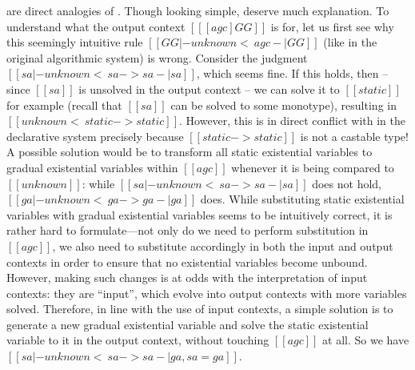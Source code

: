  are direct analogies of . Though
looking simple,  deserve much explanation. To
understand what the output context $[[ [agc]GG ]]$ is for, let us first see why
this seemingly intuitive rule $[[ GG |- unknown <~ agc -| GG ]]$ (like
 in the original algorithmic system) is wrong. Consider the
judgment $[[ sa |- unknown <~ sa -> sa -| sa ]]$, which seems fine. If this
holds, then -- since $[[sa]]$ is unsolved in the output context -- we can solve
it to $[[ static ]]$ for example (recall that $[[sa]]$ can be solved to some
monotype), resulting in $[[ unknown <~ static -> static ]]$. However, this is in
direct conflict with  in the declarative system precisely
because $[[ static -> static ]]$ is not a castable type! A possible solution
would be to transform all static existential variables to gradual existential
variables within $[[agc]]$ whenever it is being compared to $[[ unknown ]]$:
while $[[ sa |- unknown <~ sa -> sa -| sa ]]$ does not hold, $[[ ga |- unknown
<~ ga -> ga -| ga ]]$ does. While substituting static existential variables with
gradual existential variables seems to be intuitively correct, it is rather hard
to formulate---not only do we need to perform substitution in $[[agc]]$, we also
need to substitute accordingly in both the input and output contexts in order to
ensure that no existential variables become unbound. However, making such changes is
at odds with the interpretation of input contexts: they are ``input'', which
evolve into output contexts with more variables solved. Therefore, in line with
the use of input contexts, a simple solution is to generate a
new gradual existential variable and solve the static existential variable to it
in the output context, without touching $[[agc]]$ at all. So we have $[[ sa |- unknown <~ sa -> sa -| ga, sa = ga ]]$.

